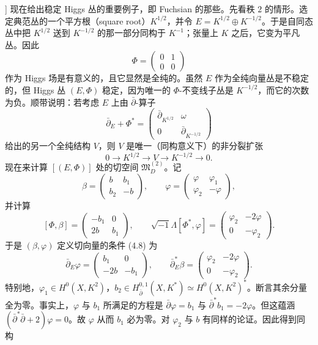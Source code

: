 \begin{example}[参看 [35, 38]]\label{ex:4.2.14}
现在给出稳定 Higgs 丛的重要例子，即 Fuchsian 的那些。先看秩 $2$ 的情形。选定典范丛的一个平方根（square root）$K^{1/2}$，并令 $E=K^{1/2}\oplus K^{-1/2}$。于是自同态丛中把 $K^{1/2}$ 送到 $K^{-1/2}$ 的那一部分同构于 $K^{-1}$；张量上 $K$ 之后，它变为平凡丛。因此
\[
\Phi=\begin{pmatrix}0&1\\0&0\end{pmatrix}
\]
作为 Higgs 场是有意义的，且它显然是全纯的。虽然 $E$ 作为全纯向量丛是不稳定的，但 Higgs 丛 $(E,\Phi)$ 稳定，因为唯一的 $\Phi$-不变线子丛是 $K^{-1/2}$，而它的次数为负。顺带说明：若考虑 $E$ 上由 $\bar\partial$-算子
\[
\bar\partial_E+\Phi^*=\begin{pmatrix}\bar\partial_{K^{1/2}}&\omega\\0&\bar\partial_{K^{-1/2}}\end{pmatrix}
\]
给出的另一个全纯结构 $V$，则 $V$ 是唯一（同构意义下）的非分裂扩张
\[
0\longrightarrow K^{1/2}\longrightarrow V\longrightarrow K^{-1/2}\longrightarrow0.
\]
现在来计算 $[(E,\Phi)]$ 处的切空间 $\mathfrak{M}_D^{(2)}$。记
\[
\beta=\begin{pmatrix}b&b_1\\b_2&-b\end{pmatrix},\qquad\varphi=\begin{pmatrix}\varphi&\varphi_1\\\varphi_2&-\varphi\end{pmatrix},
\]
并计算
\[
[\Phi,\beta]=\begin{pmatrix}-b_1&0\\2b&b_1\end{pmatrix},\qquad\sqrt{-1}\Lambda[\Phi^*,\varphi]=\begin{pmatrix}\varphi_2&-2\varphi\\0&-\varphi_2\end{pmatrix}.
\]
于是 $(\beta,\varphi)$ 定义切向量的条件 (4.8) 为
\[
\bar\partial_E\varphi=\begin{pmatrix}b_1&0\\-2b&-b_1\end{pmatrix},\qquad\bar\partial^*_E\beta=\begin{pmatrix}\varphi_2&-2\varphi\\0&-\varphi_2\end{pmatrix}.
\]
特别地，$\varphi_1\in H^0(X,K^2)$，$b_2\in H^{0,1}_{\bar\partial}(X,K^*)\simeq H^0(X,K^2)^*$。断言其余分量全为零。事实上，$\varphi$ 与 $b_1$ 所满足的方程是 $\bar\partial\varphi=b_1$ 与 $\bar\partial^*b_1=-2\varphi$。但这蕴涵 $(\bar\partial^*\bar\partial+2)\varphi=0$。故 $\varphi$ 从而 $b_1$ 必为零。对 $\varphi_2$ 与 $b$ 有同样的论证。因此得到同构

\end{example}
